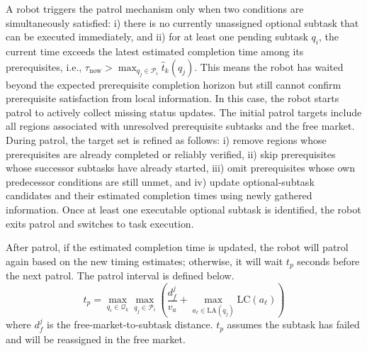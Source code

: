 \documentclass[lettersize,journal]{IEEEtran}
\begin{document}
A robot triggers the patrol mechanism only when two conditions are simultaneously satisfied: i) there is no currently unassigned optional subtask that can be executed immediately, and ii) for at least one pending subtask \(q_i\), the current time exceeds the latest estimated completion time among its prerequisites, i.e., $\tau_{\mathrm{now}} > \max_{q_j \in \mathcal{P}_i} \hat{t}_k(q_j)$. This means the robot has waited beyond the expected prerequisite completion horizon but still cannot confirm prerequisite satisfaction from local information. In this case, the robot starts patrol to actively collect missing status updates. The initial patrol targets include all regions associated with unresolved prerequisite subtasks and the free market. During patrol, the target set is refined as follows: i) remove regions whose prerequisites are already completed or reliably verified, ii) skip prerequisites whose successor subtasks have already started, iii) omit prerequisites whose own predecessor conditions are still unmet, and iv) update optional-subtask candidates and their estimated completion times using newly gathered information. Once at least one executable optional subtask is identified, the robot exits patrol and switches to task execution.

After patrol, if the estimated completion time is updated, the robot will patrol again based on the new timing estimates; otherwise, it will wait \(t_p\) seconds before the next patrol. The patrol interval is defined below.
\begin{equation}
    t_{p} = \max_{q_i \in \mathcal{Q}_k}\max_{q_j \in \mathcal{P}_i} \left( \frac{d_f^j}{v_a} + \max_{a_\ell \in \mathrm{LA}(q_j)} \mathrm{LC}(a_\ell) \right)
\end{equation}
where \(d_f^j\) is the free-market-to-subtask distance. \(t_{p}\) assumes the subtask has failed and will be reassigned in the free market.


\end{document}
